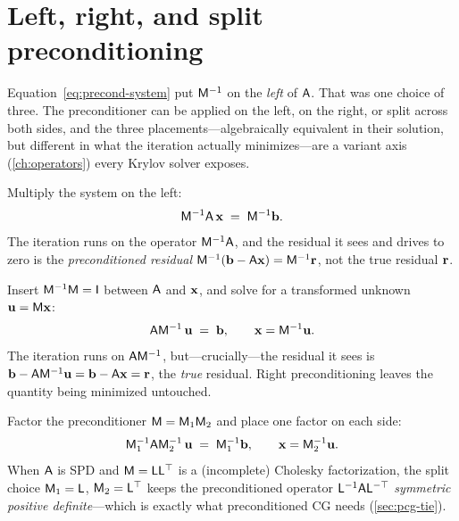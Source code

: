 \section{Left, right, and split preconditioning}
\label{sec:lrs}

Equation~\eqref{eq:precond-system} put $\mathsf{M}^{-1}$ on the \emph{left} of $\mathsf{A}$.
That was one choice of three. The preconditioner can be applied on the left, on the
right, or split across both sides, and the three placements---algebraically equivalent in
their solution, but different in what the iteration actually minimizes---are a variant
axis (\cref{ch:operators}) every Krylov solver exposes.

\begin{description}[style=nextline,leftmargin=1.5em]
  \item[Left preconditioning.] Multiply the system on the left:
  \[
    \mathsf{M}^{-1}\mathsf{A}\,\mathbf{x} \;=\; \mathsf{M}^{-1}\mathbf{b} .
  \]
  The iteration runs on the operator $\mathsf{M}^{-1}\mathsf{A}$, and the residual it sees and
  drives to zero is the \emph{preconditioned residual}
  $\mathsf{M}^{-1}(\mathbf{b}-\mathsf{A}\mathbf{x})=\mathsf{M}^{-1}\mathbf{r}$, not the true residual $\mathbf{r}$.
  \item[Right preconditioning.] Insert $\mathsf{M}^{-1}\mathsf{M}=\mathsf{I}$ between $\mathsf{A}$ and
  $\mathbf{x}$, and solve for a transformed unknown $\mathbf{u}=\mathsf{M}\mathbf{x}$:
  \[
    \mathsf{A}\mathsf{M}^{-1}\,\mathbf{u} \;=\; \mathbf{b}, \qquad \mathbf{x}=\mathsf{M}^{-1}\mathbf{u} .
  \]
  The iteration runs on $\mathsf{A}\mathsf{M}^{-1}$, but---crucially---the residual it sees is
  $\mathbf{b}-\mathsf{A}\mathsf{M}^{-1}\mathbf{u}=\mathbf{b}-\mathsf{A}\mathbf{x}=\mathbf{r}$, the \emph{true} residual. Right
  preconditioning leaves the quantity being minimized untouched.
  \item[Split preconditioning.] Factor the preconditioner $\mathsf{M}=\mathsf{M}_1\mathsf{M}_2$
  and place one factor on each side:
  \[
    \mathsf{M}_1^{-1}\mathsf{A}\mathsf{M}_2^{-1}\,\mathbf{u} \;=\; \mathsf{M}_1^{-1}\mathbf{b},
    \qquad \mathbf{x}=\mathsf{M}_2^{-1}\mathbf{u} .
  \]
  When $\mathsf{A}$ is SPD and $\mathsf{M}=\mathsf{L}\mathsf{L}^{\top}$ is a (incomplete) Cholesky
  factorization, the split choice $\mathsf{M}_1=\mathsf{L}$, $\mathsf{M}_2=\mathsf{L}^{\top}$ keeps the
  preconditioned operator $\mathsf{L}^{-1}\mathsf{A}\mathsf{L}^{-\top}$ \emph{symmetric positive
  definite}---which is exactly what preconditioned CG needs (\cref{sec:pcg-tie}).
\end{description}


